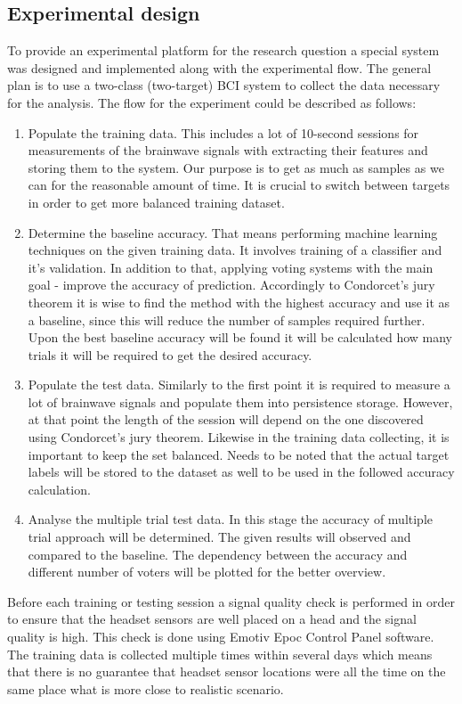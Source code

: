 \documentclass[12pt]{article}
\begin{document}
\subsection{Experimental design}
To provide an experimental platform for the research question a special system was designed and implemented along with the experimental flow. The general plan is to use a two-class (two-target) BCI system to collect the data necessary for the analysis. The flow for the experiment could be described as follows:
\begin{enumerate}
\item Populate the training data. This includes a lot of 10-second sessions for measurements of the brainwave signals with extracting their features and storing them to the system. Our purpose is to get as much as samples as we can for the reasonable amount of time. It is crucial to switch between targets in order to get more balanced training dataset.
\item Determine the baseline accuracy. That means performing machine learning techniques on the given training data. It involves training of a classifier and it's validation. In addition to that, applying voting systems with the main goal - improve the accuracy of prediction. Accordingly to Condorcet's jury theorem it is wise to find the method with the highest accuracy and use it as a baseline, since this will reduce the number of samples required further. Upon the best baseline accuracy will be found it will be calculated how many trials it will be required to get the desired accuracy.
\item Populate the test data. Similarly to the first point it is required to measure a lot of brainwave signals and populate them into persistence storage. However, at that point the length of the session will depend on the one discovered using Condorcet's jury theorem. Likewise in the training data collecting, it is important to keep the set balanced. Needs to be noted that the actual target labels will be stored to the dataset as well to be used in the followed accuracy calculation.
\item Analyse the multiple trial test data. In this stage the accuracy of multiple trial approach will be determined. The given results will observed and compared to the baseline. The dependency between the accuracy and different number of voters will be plotted for the better overview.
\end{enumerate}

Before each training or testing session a signal quality check is performed in order to ensure that the headset sensors are well placed on a head and the signal quality is high. This check is done using Emotiv Epoc Control Panel software. The training data is collected multiple times within several days which means that there is no guarantee that headset sensor locations were all the time on the same place what is more close to realistic scenario. 
\end{document}
